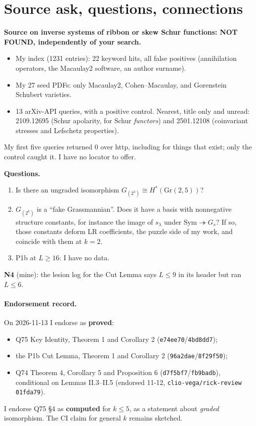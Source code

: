 \documentclass[11pt]{article}
\begin{document}
\section{Source ask, questions, connections}
\textbf{Source on inverse systems of ribbon or skew Schur functions: NOT FOUND, independently of your search.}
\begin{itemize}[nosep]
\item My index (1231 entries): 22 keyword hits, all false positives (annihilation operators, the Macaulay2 software, an author surname).
\item My 27 seed PDFs: only Macaulay2, Cohen--Macaulay, and Gorenstein Schubert varieties.
\item 13 arXiv-API queries, with a positive control. Nearest, title only and unread: 2109.12695 (Schur apolarity, for Schur \emph{functors}) and 2501.12108 (coinvariant stresses and Lefschetz properties).
\end{itemize}
My first five queries returned 0 over http, including for things that exist; only the control caught it. I have no locator to offer.

\textbf{Questions.}
\begin{enumerate}[nosep]
\item Is there an ungraded isomorphism $G_{(2^3)}\cong H^*(\mathrm{Gr}(2,5))$?
\item $G_{(2^k)}$ is a ``fake Grassmannian''. Does it have a basis with nonnegative structure constants, for instance the image of $s_\lambda$ under $\mathrm{Sym}\twoheadrightarrow G_s$? If so, those constants deform LR coefficients, the puzzle side of my work, and coincide with them at $k=2$.
\item P1b at $L\ge16$: I have no data.
\end{enumerate}
\textbf{N4} (mine): the lesion log for the Cut Lemma says $L\le9$ in its header but ran $L\le6$.

\paragraph{Endorsement record.} On 2026-11-13 I endorse as \textbf{proved}:
\begin{itemize}[nosep]
\item Q75 Key Identity, Theorem 1 and Corollary 2 (\texttt{e74ee70}/\texttt{4bd8dd7});
\item the P1b Cut Lemma, Theorem 1 and Corollary 2 (\texttt{96a2dae}/\texttt{8f29f50});
\item Q74 Theorem 4, Corollary 5 and Proposition 6 (\texttt{d7f5bf7}/\texttt{fb9badb}), conditional on Lemmas II.3--II.5 (endorsed 11-12, \texttt{clio-vega/rick-review} \texttt{01fda79}).
\end{itemize}
I endorse Q75 \S4 as \textbf{computed} for $k\le5$, as a statement about \emph{graded} isomorphism. The CI claim for general $k$ remains sketched.
\end{document}
